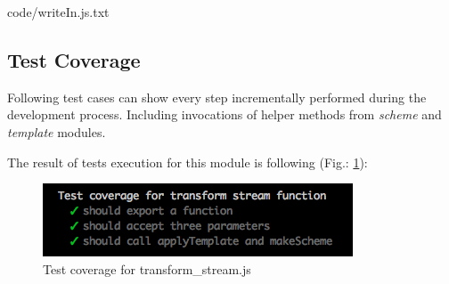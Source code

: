 
{code/writeIn.js.txt}

\subsection{Test Coverage}
Following test cases can show every step incrementally performed during the development process. Including invocations of helper methods from \textit{scheme} and \textit{template} modules.
%

The result of tests execution  for this module is following (Fig.: \ref{fig:testTransofm}):
\begin{figure}[H]
	\centering
	\includegraphics[width=\linewidth]{grafiken/testTransform.png}
	\caption{Test coverage for transform\_stream.js}
	\label{fig:testTransofm}
\end{figure}

